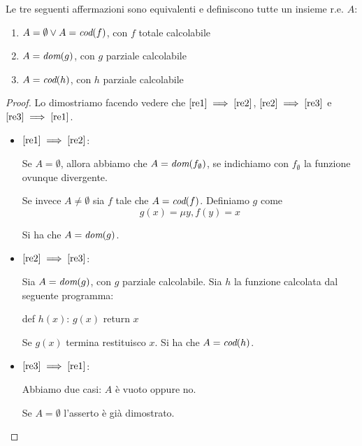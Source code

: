 \begin{thm}
    Le tre seguenti affermazioni sono equivalenti e definiscono tutte un insieme r.e. $A$:
    \begin{enumerate}
        \item \label{re1} $A = \emptyset \lor A = \textit{cod}(f)$, con $f$ totale calcolabile \\
        \item \label{re2} $A = \textit{dom}(g)$, con $g$ parziale calcolabile \\
        \item \label{re3} $A = \textit{cod}(h)$, con $h$  parziale calcolabile
    \end{enumerate}
\end{thm}
\begin{proof}
    Lo dimostriamo facendo vedere che $\eqref{re1} \implies \eqref{re2}$, $\eqref{re2} \implies
    \eqref{re3}$ e $\eqref{re3} \implies \eqref{re1}$.

    \begin{itemize}
        \item $\eqref{re1} \implies \eqref{re2}$:

        Se $A = \emptyset$, allora abbiamo che $A = \textit{dom}(f_{\emptyset})$, se indichiamo con
        $f_{\emptyset}$ la funzione ovunque divergente.

        Se invece $A \not= \emptyset$ sia $f$ tale che $A = \textit{cod}(f)$. Definiamo $g$ come
        \begin{equation*}
            g(x) = \mu y, f(y) = x
        \end{equation*}
        
        Si ha che $A = \textit{dom}(g)$.

        \item $\eqref{re2} \implies \eqref{re3}$:

        Sia $A = \textit{dom}(g)$, con $g$ parziale calcolabile. Sia $h$ la funzione calcolata dal seguente
        programma:
        \begin{python}
            def $h(x)$:
                $g(x)$ 
                return $x$ 
        \end{python}
        Se $g(x)$ termina restituisco $x$. Si ha che $A = \textit{cod}(h)$.

        \item $\eqref{re3} \implies \eqref{re1}$: 
        
        Abbiamo due casi: $A$ è vuoto oppure no.

        Se $A = \emptyset$ l'asserto è già dimostrato.


\end{itemize}
\end{proof}
